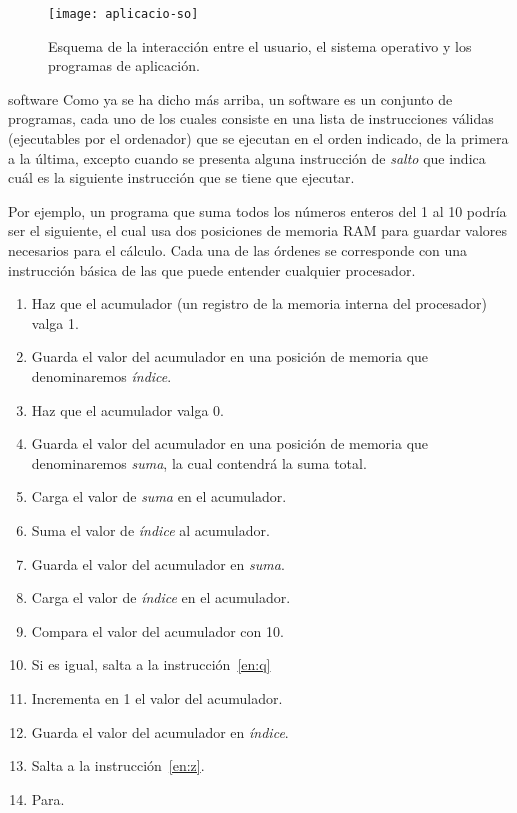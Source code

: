 \begin{figure} \centering

\texttt{[image: aplicacio-so]} \caption{Esquema de la interacción entre el usuario, el sistema operativo y los programas de aplicación.} \label{fg:aplicacio-so} \end{figure} 

\begin{persabermes}{software} Como ya se ha dicho más arriba, un software es un conjunto de programas, cada uno de los cuales consiste en una lista de instrucciones válidas (ejecutables por el ordenador) que se ejecutan en el orden indicado, de la primera a la última, excepto cuando se presenta alguna instrucción de \emph{salto} que indica cuál es la siguiente instrucción que se tiene que ejecutar. 

Por ejemplo, un programa que suma todos los números enteros del 1 al 10 podría ser el siguiente, el cual usa dos posiciones de memoria RAM para guardar valores necesarios para el cálculo. Cada una de las órdenes se corresponde con una instrucción básica de las que puede entender cualquier procesador. \begin{enumerate} \item Haz que el acumulador (un registro de la memoria interna del procesador) valga 1. \item Guarda el valor del acumulador en una posición de memoria que denominaremos \emph{índice}. \item Haz que el acumulador valga 0. \item Guarda el valor del acumulador en una posición de memoria que denominaremos \emph{suma}, la cual contendrá la suma total. \item \label{en:z} Carga el valor de \emph{suma} en el acumulador. \item Suma el valor de \emph{índice} al acumulador. \item Guarda el valor del acumulador en \emph{suma}. \item Carga el valor de \emph{índice} en el acumulador. \item Compara el valor del acumulador con 10. \item Si es igual, salta a la instrucción~\ref{en:q} \item Incrementa en 1 el valor del acumulador. \item Guarda el valor del acumulador en \emph{índice}. \item Salta a la instrucción~\ref{en:z}. \item \label{en:q} Para. \end{enumerate} 


\end{persabermes}

